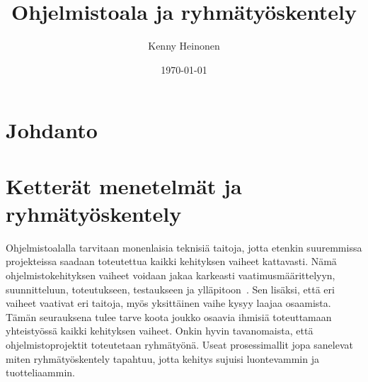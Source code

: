 \documentclass[finnish]{../tktltiki2}
\title{Ohjelmistoala ja ryhmätyöskentely}
\author{Kenny Heinonen}
\date{\today}
\theoremstyle{definition}
\theoremstyle{remark}
\begin{document}

\maketitle        %

\tableofcontents  %
\newpage          %



\section{Johdanto}

\section{Ketterät menetelmät ja ryhmätyöskentely}


Ohjelmistoalalla tarvitaan monenlaisia teknisiä taitoja, jotta etenkin 
suuremmissa projekteissa saadaan toteutettua kaikki kehityksen vaiheet 
kattavasti. Nämä ohjelmistokehityksen vaiheet voidaan jakaa karkeasti 
vaatimusmäärittelyyn, suunnitteluun, toteutukseen, testaukseen ja 
ylläpitoon~\cite{Capretz:2010:MSS:1726559.1726574}. Sen lisäksi, että 
eri vaiheet vaativat eri taitoja, myös yksittäinen vaihe kysyy laajaa 
osaamista. Tämän seurauksena tulee tarve koota joukko osaavia ihmisiä 
toteuttamaan yhteistyössä kaikki kehityksen vaiheet. Onkin hyvin 
tavanomaista, että ohjelmistoprojektit toteutetaan ryhmätyönä. Useat 
prosessimallit jopa sanelevat miten ryhmätyöskentely tapahtuu, jotta 
kehitys sujuisi luontevammin ja tuotteliaammin.\\
\end{document}
